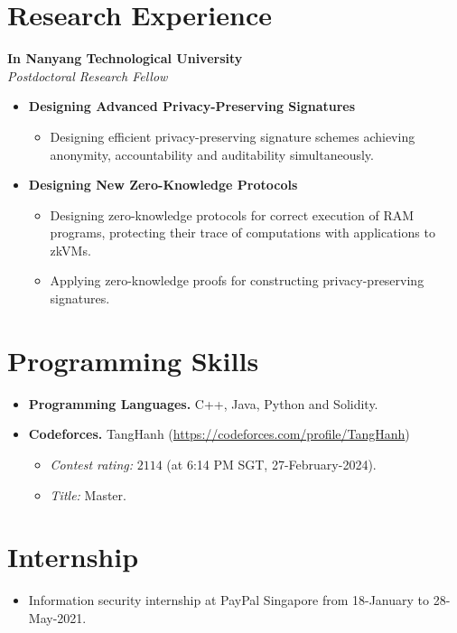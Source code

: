 \documentclass[a4paper, 11pt]{article}
\begin{document}
	\section{Research Experience}
	\textbf{In Nanyang Technological University}\\
	\textit{Postdoctoral Research Fellow}
	\begin{itemize}
		\item \textbf{Designing Advanced Privacy-Preserving Signatures}
		\begin{itemize}
			\item Designing efficient privacy-preserving signature schemes achieving anonymity, accountability and auditability simultaneously.
		\end{itemize}
		\item \textbf{Designing New Zero-Knowledge Protocols}
		\begin{itemize}
			\item Designing zero-knowledge protocols for correct execution of RAM programs, protecting their trace of computations with applications to zkVMs.
			\item Applying zero-knowledge proofs for constructing privacy-preserving signatures.
		\end{itemize}
	\end{itemize}
	
	\section{Programming Skills}
	\begin{itemize}[noitemsep]
		\item \textbf{Programming Languages.} C++, Java, Python and Solidity.
		\item \textbf{Codeforces.} TangHanh (\url{https://codeforces.com/profile/TangHanh})
		\begin{itemize}
			\item \textit{Contest rating:} $2114$ (at 6:14 PM SGT, 27-February-2024).
			\item \textit{Title:} Master.
		\end{itemize}
	\end{itemize}
	
	\section{Internship}
	\begin{itemize}
		\item Information security internship at PayPal Singapore from 18-January to 28-May-2021.
	\end{itemize}
	
\end{document}
